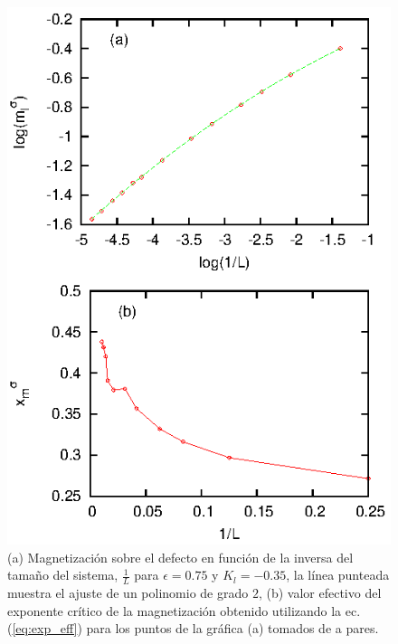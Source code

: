 \begin{figure}[htbp!]
	
	\begin{center}
		\includegraphics[width=\figwidth]{graf/exp/mag_exp_e0.75_Jln0.35.eps}
	\end{center}
	
	\caption{(a) Magnetizaci\'on sobre el defecto en funci\'on de la inversa del tamaño del sistema, $\frac{1}{L}$ para
	$\epsilon=0.75$ y $K_{l}=-0.35$, la l\'inea punteada muestra el ajuste de un polinomio de grado $2$, (b) valor efectivo
	del exponente cr\'itico de la magnetizaci\'on obtenido utilizando la ec.(\ref{eq:exp_eff})
	para los puntos de la gr\'afica (a) tomados de a pares.}
	
	\label{fig:xfits}
	
\end{figure}

